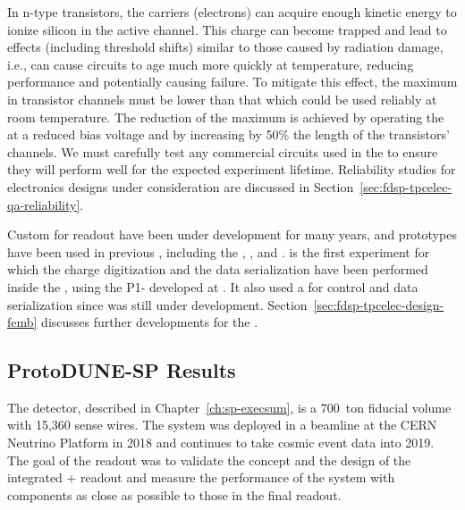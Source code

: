 In n-type  transistors, the carriers (electrons)
can acquire enough kinetic energy to ionize silicon in the active channel. This
charge can become trapped and lead to effects (including threshold shifts)
similar to those caused by radiation damage, i.e., can cause 
circuits to age much more quickly at  temperature, 
reducing performance and potentially causing failure. To mitigate this effect,
the maximum \efield in transistor channels must be lower than 
that which could be used reliably at room temperature. The reduction of
the maximum \efield is achieved by operating the  at a
reduced bias voltage and by increasing by 50\% the length 
of the transistors' channels. We must carefully test any commercial 
circuits used in the  to ensure they will perform well for 
the expected experiment lifetime. Reliability studies for  
electronics designs under consideration are discussed in Section~\ref{sec:fdsp-tpcelec-qa-reliability}.


Custom  for  readout have been under development for many years, and
 prototypes have been used in previous , 
including the , , and .  is the first
experiment for which the charge digitization %
and the data serialization
have been performed inside the , using the P1-  
developed at . %
It also used a  for control and data serialization since  was
still under development. %
Section~\ref{sec:fdsp-tpcelec-design-femb} discusses further  developments for the .

\subsection{ProtoDUNE-SP Results}
\label{sec:fdsp-tpcelec-overview-pdune}

The %
detector, described 
in Chapter~\ref{ch:sp-execsum}, is a 700~ton fiducial volume 
 with 15,360 sense wires. 
The system was deployed in a beamline at the CERN Neutrino Platform 
in 2018 and continues to take cosmic event data into 2019. The goal of 
the   readout was to validate the concept 
and the design of the integrated + readout 
and measure the performance of the  system with components 
as close as possible to those in the final   readout.

